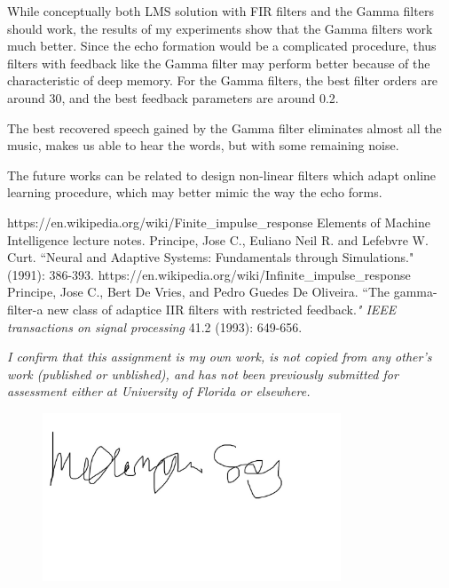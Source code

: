 \documentclass[conference]{IEEEtran}
\begin{document}
	While conceptually both LMS solution with FIR filters and the Gamma filters should work, the results of my experiments show that the Gamma filters work much better. Since the echo formation would be a complicated procedure, thus filters with feedback like the Gamma filter may perform better because of the characteristic of deep memory. For the Gamma filters, the best filter orders are around 30, and the best feedback parameters are around 0.2.

	The best recovered speech gained by the Gamma filter eliminates almost all the music, makes us able to hear the words, but with some remaining noise. 

	The future works can be related to design non-linear filters which adapt online learning procedure, which may better mimic the way the echo forms.
	

\begin{thebibliography}{00}
 https://en.wikipedia.org/wiki/Finite\_impulse\_response
 Elements of Machine Intelligence lecture notes.
 Principe, Jose C., Euliano Neil R. and Lefebvre W. Curt. ``Neural and Adaptive Systems: Fundamentals through Simulations." (1991): 386-393.
https://en.wikipedia.org/wiki/Infinite\_impulse\_response
Principe, Jose C., Bert De Vries, and Pedro Guedes De Oliveira. ``The gamma-filter-a new class of adaptice IIR filters with restricted feedback.\emph{" IEEE transactions on signal processing} 41.2 (1993): 649-656.
\end{thebibliography}

\emph{I confirm that this assignment is my own work, is not copied from any other's work (published or unblished), and has not been previously submitted for assessment either at University of Florida or elsewhere.}
	\begin{figure}[htbp]
	\centerline{\includegraphics[width=3.5in]{sig.jpg}}

	\label{gamma100}
	\end{figure}
\end{document}
